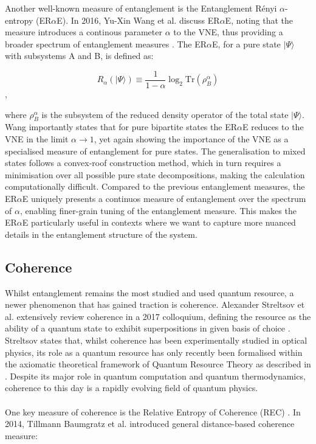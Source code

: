 \documentclass[12pt,a4paper]{article}
\begin{document}
Another well-known measure of entanglement is the Entanglement R\'enyi $\alpha$-entropy (ER$\alpha$E). In 2016, Yu-Xin Wang et al. discuss ER$\alpha$E, noting that the measure introduces a continous parameter $\alpha$ to the VNE, thus providing a broader spectrum of entanglement measures \cite{Entanglement2016-ERaE_Definition}. The ER$\alpha$E, for a pure state $|\Psi\rangle$ with subsystems A and B, is defined as:

\begin{equation}
    R_{\alpha}(|\Psi\rangle) \equiv \frac{1}{1-\alpha}\log_2{\text{Tr}(\rho_B^\alpha)}
\end{equation},

where $\rho_B^\alpha$ is the subsystem of the reduced density operator of the total state $|\Psi\rangle$. Wang importantly states that for pure bipartite states the ER$\alpha$E reduces to the VNE in the limit $\alpha \rightarrow 1$, yet again showing the importance of the VNE as a specialised measure of entanglement for pure states. The generalisation to mixed states follows a convex-roof construction method, which in turn requires a minimisation over all possible pure state decompositions, making the calculation computationally difficult. Compared to the previous entanglement measures, the ER$\alpha$E uniquely presents a continuos measure of entanglement over the spectrum of $\alpha$, enabling finer-grain tuning of the entanglement measure. This makes the ER$\alpha$E particularly useful in contexts where we want to capture more nuanced details in the entanglement structure of the system. 

\subsection{Coherence}

Whilst entanglement remains the most studied and used quantum resource, a newer phenomenon that has gained traction is coherence. Alexander Streltsov et al. extensively review coherence in a 2017 colloquium, defining the resource as the ability of a quantum state to exhibit superpositions in given basis of choice \cite{Coherence2017-Colloquium}. Streltsov states that, whilst coherence has been experimentally studied in optical physics, its role as a quantum resource has only recently been formalised within the axiomatic theoretical framework of Quantum Resource Theory as described in \cite{CohEnt2019-QRT_def}. Despite its major role in quantum computation and quantum thermodynamics, coherence to this day is a rapidly evolving field of quantum physics. \\
\\
One key measure of coherence is the Relative Entropy of Coherence (REC) \cite{Coherence2014-seed}. In 2014, Tillmann Baumgratz et al. introduced general distance-based coherence measure:
\end{document}
